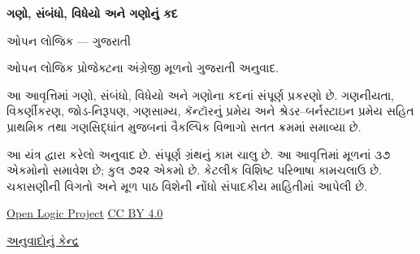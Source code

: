 
\usepackage[authoryear]{natbib}
\renewcommand{\refname}{સંદર્ભગ્રંથો}
\renewcommand{\partname}{ભાગ}
\newenvironment{intro}{}{}
\newcommand{\Id}[1]{\mathord{\mathrm{Id}_{#1}}}
\newcommand{\equivrep}[2]{[#1]_{#2}}
\newcommand{\equivclass}[2]{#1/_{\!{#2}}}
\newcommand{\funrestrictionto}[2]{#1\mathord{\restriction}_{#2}}
\newcommand{\funimage}[2]{#1[#2]}
\newcommand{\emptyseq}{\Lambda}
\newcommand{\liff}{\mathbin{\leftrightarrow}}
\newcommand{\dom}[1]{\mathrm{dom}(#1)}
\newcommand{\ran}[1]{\mathrm{ran}(#1)}
\newcommand{\comp}[2]{#2\circ #1}
\newcommand{\pto}{\mathrel{\ooalign{\hfil$\mapstochar\mkern5mu$\hfil\cr$\to$}}}
\newcommand{\fdefined}{\downarrow}
\newcommand{\fundefined}{\uparrow}
\newcommand{\sourcecorrection}[2]{%
  \par\smallskip\noindent
  \fbox{\begin{minipage}{0.94\linewidth}\small
    \textbf{સ્રોત-સુધારો #1.} #2
  \end{minipage}}%
  \par\smallskip}
\newlength{\olphotowidth}
\setlength{\olphotowidth}{.4\textwidth}

\renewcommand{\oliflabeldef}[3]{\ifcsname guavailable@#1\endcsname#2\else#3\fi}

\begin{titlepage}
{\Huge\bfseries ગણો, સંબંધો, વિધેયો અને ગણોનું કદ\par}
\vspace{1em}
{\Large ઓપન લોજિક — ગુજરાતી\par}
\vspace{2em}
ઓપન લોજિક પ્રોજેક્ટના અંગ્રેજી મૂળનો ગુજરાતી અનુવાદ.\par
\vspace{1em}
આ આવૃત્તિમાં ગણો, સંબંધો, વિધેયો અને ગણોના કદનાં સંપૂર્ણ પ્રકરણો છે.
ગણનીયતા, વિકર્ણીકરણ, જોડ-નિરૂપણ, ગણસામ્ય, કૅન્ટૉરનું પ્રમેય અને
શ્રેડર--બર્નસ્ટાઇન પ્રમેય સહિત પ્રાથમિક તથા ગણસિદ્ધાંત મુજબનાં
વૈકલ્પિક વિભાગો સતત ક્રમમાં સમાવ્યા છે.\par
\vfill
આ યંત્ર દ્વારા કરેલો અનુવાદ છે. સંપૂર્ણ ગ્રંથનું કામ ચાલુ છે.
આ આવૃત્તિમાં મૂળનાં ૩૭ એકમોનો સમાવેશ છે; કુલ ૭૨૨ એકમો છે.
કેટલીક વિશિષ્ટ પરિભાષા કામચલાઉ છે. ચકાસણીની વિગતો અને
મૂળ પાઠ વિશેની નોંધો સંપાદકીય માહિતીમાં આપેલી છે.\par
\vspace{1em}
\href{https://github.com/OpenLogicProject/OpenLogic}{Open Logic Project}
\quad \href{https://creativecommons.org/licenses/by/4.0/}{CC BY 4.0}\par
\href{https://github.com/KokunoYumeto/OpenLogic-translations}{અનુવાદોનું કેન્દ્ર}\par
\end{titlepage}
\tableofcontents
\clearpage

\clearpage
